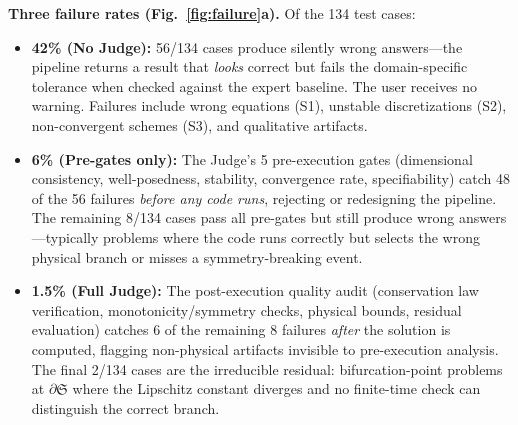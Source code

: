 \documentclass[11pt,a4paper]{article}
\newcommand{\Sclass}{\mathfrak{S}}
\begin{document}
\textbf{Three failure rates (Fig.~\ref{fig:failure}a).} Of the 134 test cases:
\begin{itemize}[nosep]
\item \textbf{42\% (No Judge):} 56/134 cases produce silently wrong answers---the pipeline returns a result that \emph{looks} correct but fails the domain-specific tolerance when checked against the expert baseline. The user receives no warning. Failures include wrong equations (S1), unstable discretizations (S2), non-convergent schemes (S3), and qualitative artifacts.
\item \textbf{6\% (Pre-gates only):} The Judge's 5 pre-execution gates (dimensional consistency, well-posedness, stability, convergence rate, specifiability) catch 48 of the 56 failures \emph{before any code runs}, rejecting or redesigning the pipeline. The remaining 8/134 cases pass all pre-gates but still produce wrong answers---typically problems where the code runs correctly but selects the wrong physical branch or misses a symmetry-breaking event.
\item \textbf{1.5\% (Full Judge):} The post-execution quality audit (conservation law verification, monotonicity/symmetry checks, physical bounds, residual evaluation) catches 6 of the remaining 8 failures \emph{after} the solution is computed, flagging non-physical artifacts invisible to pre-execution analysis. The final 2/134 cases are the irreducible residual: bifurcation-point problems at $\partial \Sclass$ where the Lipschitz constant diverges and no finite-time check can distinguish the correct branch.
\end{itemize}

\end{document}
